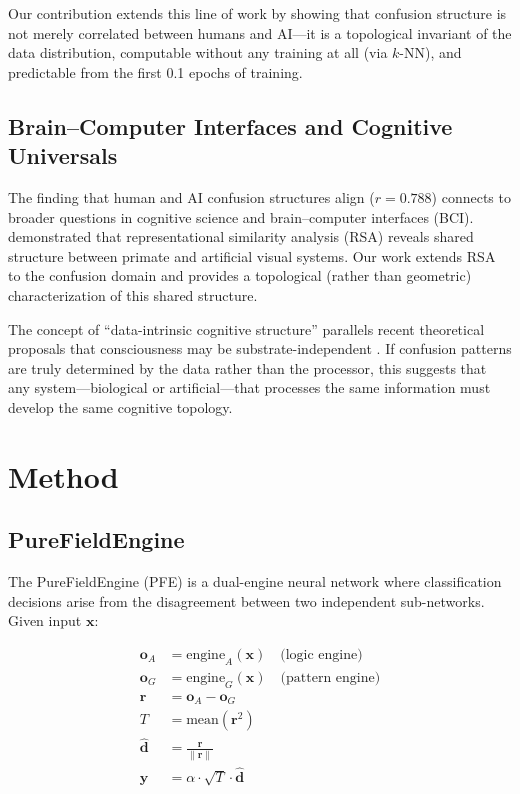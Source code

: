 \documentclass[11pt,a4paper]{article}
\begin{document}
Our contribution extends this line of work by showing that confusion structure is not merely correlated between humans and AI---it is a topological invariant of the data distribution, computable without any training at all (via $k$-NN), and predictable from the first 0.1 epochs of training.

\subsection{Brain--Computer Interfaces and Cognitive Universals}

The finding that human and AI confusion structures align ($r = 0.788$) connects to broader questions in cognitive science and brain--computer interfaces (BCI). \citet{kriegeskorte2008} demonstrated that representational similarity analysis (RSA) reveals shared structure between primate and artificial visual systems. Our work extends RSA to the confusion domain and provides a topological (rather than geometric) characterization of this shared structure.

The concept of ``data-intrinsic cognitive structure'' parallels recent theoretical proposals that consciousness may be substrate-independent \citep{tononi2016,koch2016}. If confusion patterns are truly determined by the data rather than the processor, this suggests that any system---biological or artificial---that processes the same information must develop the same cognitive topology.

\section{Method}
\label{sec:method}

\subsection{PureFieldEngine}

The PureFieldEngine (PFE) is a dual-engine neural network where classification decisions arise from the disagreement between two independent sub-networks. Given input $\mathbf{x}$:

\begin{align}
  \mathbf{o}_A &= \text{engine}_A(\mathbf{x}) \quad \text{(logic engine)} \\
  \mathbf{o}_G &= \text{engine}_G(\mathbf{x}) \quad \text{(pattern engine)} \\
  \mathbf{r} &= \mathbf{o}_A - \mathbf{o}_G \\
  T &= \text{mean}(\mathbf{r}^2) \\
  \hat{\mathbf{d}} &= \frac{\mathbf{r}}{\|\mathbf{r}\|} \\
  \mathbf{y} &= \alpha \cdot \sqrt{T} \cdot \hat{\mathbf{d}}
\end{align}
\end{document}
